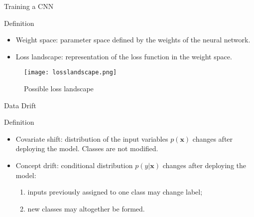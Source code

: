\begin{frame}{Training a CNN}
    \begin{definitionblock}{Definition}
        \begin{itemize}
            \item <1-> Weight space: parameter space defined by the weights of the neural network.
            \item <2-> Loss landscape: representation of the loss function in the weight space.
        \end{itemize}
    \end{definitionblock}
    \begin{figure}
        \texttt{[image: losslandscape.png]}
        \caption*{Possible loss landscape}
    \end{figure}
\end{frame}

\begin{frame}{Data Drift}
    \begin{definitionblock}{Definition}
        \begin{itemize}
            \item <1-> Covariate shift: distribution of the input variables $p(\mathbf{x})$ changes after deploying the model. Classes are not modified.
            \item <2-> Concept drift: conditional distribution $p(y|\mathbf{x})$ changes after deploying the model:
            \begin{enumerate}
                \item <3-> inputs previously assigned to one class may change label;
                \item <4-> new classes may altogether be formed.
            \end{enumerate}
        \end{itemize}
    \end{definitionblock}

\end{frame}

